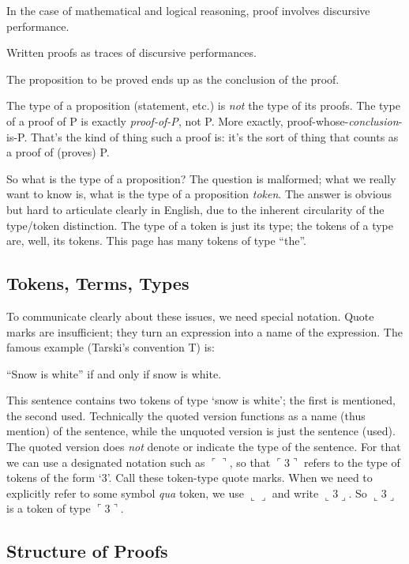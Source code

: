 In the case of mathematical and logical reasoning, proof involves
discursive performance.

Written proofs as traces of discursive performances.

The proposition to be proved ends up as the conclusion of the proof.

The type of a proposition (statement, etc.) is \textit{not} the type
of its proofs.  The type of a proof of P is exactly
\textit{proof-of-P}, not P.  More exactly,
proof-whose-\textit{conclusion}-is-P.  That's the kind of thing such a
proof is: it's the sort of thing that counts as a proof of (proves) P.

So what is the type of a proposition?  The question is malformed; what
we really want to know is, what is the type of a proposition
\textit{token}.  The answer is obvious but hard to articulate clearly
in English, due to the inherent circularity of the type/token
distinction.  The type of a token is just its type; the tokens of a
type are, well, its tokens.  This page has many tokens of type
\enquote{the}.

\subsection{Tokens, Terms, Types}
\label{subsec:tokens-terms-types}

To communicate clearly about these issues, we need special notation.
Quote marks are insufficient; they turn an expression into a name of
the expression.  The famous example (Tarski's convention T) is:

\enquote{Snow is white} if and only if snow is white.

This sentence contains two tokens of type `snow is white'; the first
is mentioned, the second used.  Technically the quoted version
functions as a name (thus mention) of the sentence, while the unquoted
version is just the sentence (used).  The quoted version does
\textit{not} denote or indicate the type of the sentence.  For that we
can use a designated notation such as \(\ulcorner \urcorner\), so that
\(\ulcorner\)3\(\urcorner\) refers to the type of tokens of the form
`3'.  Call these token-type quote marks.  When we need to explicitly
refer to some symbol \textit{qua} token, we use \(\llcorner \lrcorner\)
and write \(\llcorner 3\lrcorner\).  So \(\llcorner 3\lrcorner\) is a
token of type \(\ulcorner 3\urcorner\).

\subsection{Structure of Proofs}
\label{subsec:structproofs}

